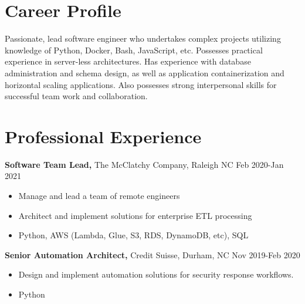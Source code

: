 \documentclass{res}
\begin{document}
 
 
\address{{\bf Present Address} \\ 5973 Dixon Dr. \\ Raleigh, NC 27609  \\
        (336) 681-7224 }
\address{{\bf Permanent Address} \\ 114 East Keeling Rd \\ Greensboro, NC 27410}
 
\begin{resume} 

\noindent\makebox[5.5in]{\rule{6.5in}{0.4pt}}


\section{Career Profile} 
  Passionate, lead software engineer who undertakes complex projects utilizing knowledge of Python, Docker, Bash, JavaScript, etc. Possesses practical experience in server-less architectures. Has experience with database administration and schema design, as well as application containerization and horizontal scaling applications. Also possesses strong interpersonal skills for successful team work and collaboration.
\section{Professional Experience}
  {\bf Software Team Lead,} The McClatchy Company, Raleigh NC \hfill Feb 2020-Jan 2021
    \begin{itemize} \itemsep -2pt
      \item Manage and lead a team of remote engineers
      \item Architect and implement solutions for enterprise ETL processing
      \item Python, AWS (Lambda, Glue, S3, RDS, DynamoDB, etc), SQL
    \end{itemize}

  {\bf Senior Automation Architect,} Credit Suisse, Durham, NC \hfill Nov 2019-Feb 2020
    \begin{itemize} \itemsep -2pt
      \item Design and implement automation solutions for security response workflows.
      \item Python
    \end{itemize}


\end{resume}
\end{document}
